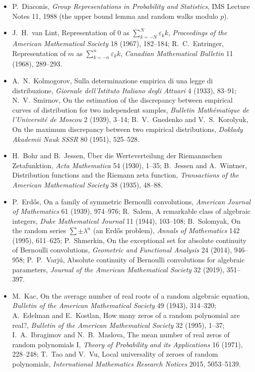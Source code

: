 \begin{itemize}
\item P.~Diaconis, \emph{Group Representations in Probability and Statistics}, IMS Lecture Notes 11, 1988 (the upper bound lemma and random walks modulo $p$).
\item J.~H.~van Lint, Representation of $0$ as $\sum_{k=-N}^N\varepsilon_kk$, \emph{Proceedings of the American Mathematical Society} 18 (1967), 182--184; R.~C.~Entringer, Representation
of $m$ as $\sum_{k=-n}^n\varepsilon_kk$, \emph{Canadian Mathematical Bulletin} 11 (1968), 289--293.
\item A.~N.~Kolmogorov, Sulla determinazione empirica di una legge di distribuzione, \emph{Giornale dell'Istituto Italiano degli Attuari} 4 (1933), 83--91; N.~V.~Smirnov, On the
estimation of the discrepancy between empirical curves of distribution for two independent samples, \emph{Bulletin Mathématique de l'Université de Moscou} 2 (1939), 3--14;
B.~V.~Gnedenko and V.~S.~Korolyuk, On the maximum discrepancy between two empirical distributions, \emph{Doklady Akademii Nauk SSSR} 80 (1951), 525--528.
\item H.~Bohr and B.~Jessen, Über die Werteverteilung der Riemannschen Zetafunktion, \emph{Acta Mathematica} 54 (1930), 1--35; B.~Jessen and A.~Wintner, Distribution functions
and the Riemann zeta function, \emph{Transactions of the American Mathematical Society} 38 (1935), 48--88.
\item P.~Erdős, On a family of symmetric Bernoulli convolutions, \emph{American Journal of Mathematics} 61 (1939), 974--976; R.~Salem, A remarkable class of algebraic integers,
\emph{Duke Mathematical Journal} 11 (1944), 103--108; B.~Solomyak, On the random series $\sum\pm\lambda^n$ (an Erdős problem), \emph{Annals of Mathematics} 142 (1995), 611--625;
P.~Shmerkin, On the exceptional set for absolute continuity of Bernoulli convolutions, \emph{Geometric and Functional Analysis} 24 (2014), 946--958; P.~P.~Varjú, Absolute continuity
of Bernoulli convolutions for algebraic parameters, \emph{Journal of the American Mathematical Society} 32 (2019), 351--397.
\item M.~Kac, On the average number of real roots of a random algebraic equation, \emph{Bulletin of the American Mathematical Society} 49 (1943), 314--320; A.~Edelman and E.~Kostlan,
How many zeros of a random polynomial are real?, \emph{Bulletin of the American Mathematical Society} 32 (1995), 1--37; I.~A.~Ibragimov and N.~B.~Maslova, The mean number of real
zeros of random polynomials I, \emph{Theory of Probability and its Applications} 16 (1971), 228--248; T.~Tao and V.~Vu, Local universality of zeroes of random polynomials,
\emph{International Mathematics Research Notices} 2015, 5053--5139.
\end{itemize}
